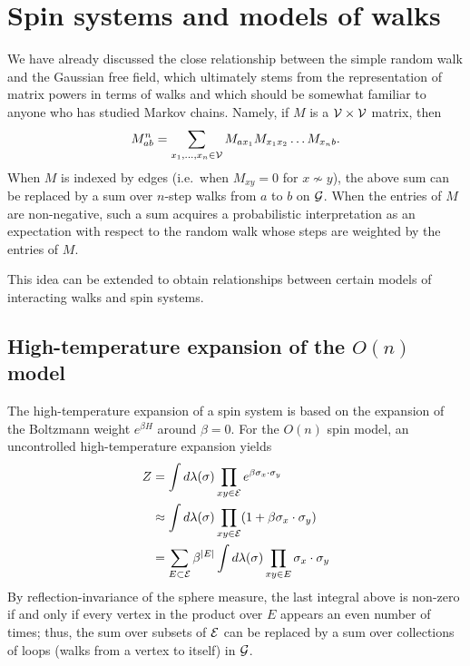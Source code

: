 
\section{Spin systems and models of walks}

We have already discussed the close relationship between the simple random walk
and the Gaussian free field, which ultimately stems from the representation of
matrix powers in terms of walks and which should be somewhat familiar to anyone
who has studied Markov chains. Namely, if $M$ is a $\mathcal{V}\times\mathcal{V}$
matrix, then
\begin{equation}
M^n_{ab} = \sum_{x_1,\ldots,x_n\in\mathcal{V}} M_{ax_1} M_{x_1x_2} \ldots M_{x_nb}.
\end{equation}
When $M$ is indexed by edges (i.e.\ when $M_{xy} = 0$ for $x \not\sim y$), the
above sum can be replaced by a sum over $n$-step walks from $a$ to $b$ on $\mathcal{G}$.
When the entries of $M$ are non-negative, such a sum acquires a probabilistic
interpretation as an expectation with respect to the random walk whose steps
are weighted by the entries of $M$.

This idea can be extended to obtain relationships between certain models of
interacting walks and spin systems.


\subsection{High-temperature expansion of the \texorpdfstring{$O(n)$}{O(n)} model}

The high-temperature expansion of a spin system is based on the expansion of the
Boltzmann weight $e^{\beta H}$ around $\beta = 0$.
For the $O(n)$ spin model, an uncontrolled high-temperature expansion yields
\begin{align}
Z 	&= \int d\lambda(\sigma) \prod_{xy\in\mathcal{E}} e^{\beta \sigma_x \cdot \sigma_y} \\
	&\approx \int d\lambda(\sigma) \prod_{xy\in\mathcal{E}} (1 + \beta \sigma_x \cdot \sigma_y) \\
	&= \sum_{E \subset \mathcal{E}} \beta^{|E|} \int d\lambda(\sigma) \prod_{xy \in E} \sigma_x \cdot \sigma_y
\end{align}
By reflection-invariance of the sphere measure, the last integral above is non-zero
if and only if every vertex in the product over $E$ appears an even number of times;
thus, the sum over subsets of $\mathcal{E}$ can be replaced by a sum over collections of
loops (walks from a vertex to itself) in $\mathcal{G}$.

